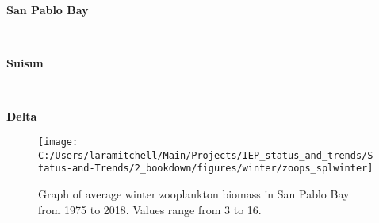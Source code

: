 \documentclass[
]{book}
\begin{document}
\begin{panel-grid}

\begin{columns-nocenter}

\begin{column800}

\textbf{San Pablo Bay}

\end{column800}

\begin{column40}

~

\end{column40}

\begin{column800}

\textbf{Suisun}

\end{column800}

\begin{column40}

~

\end{column40}

\begin{column800}

\textbf{Delta}

\end{column800}

\end{columns-nocenter}

\begin{columns-nocenter}

\begin{column800}

\begin{expand}

\begin{figure}
\texttt{[image: C:/Users/laramitchell/Main/Projects/IEP\_status\_and\_trends/Status-and-Trends/2\_bookdown/figures/winter/zoops\_splwinter]} \caption{Graph of average winter zooplankton biomass in San Pablo Bay from 1975 to 2018. Values range from 3 to 16.}\label{fig:unnamed-chunk-165}
\end{figure}

\end{expand}

\end{column800}

\begin{column40}

~


\end{column40}
\end{columns-nocenter}
\end{panel-grid}
\end{document}
